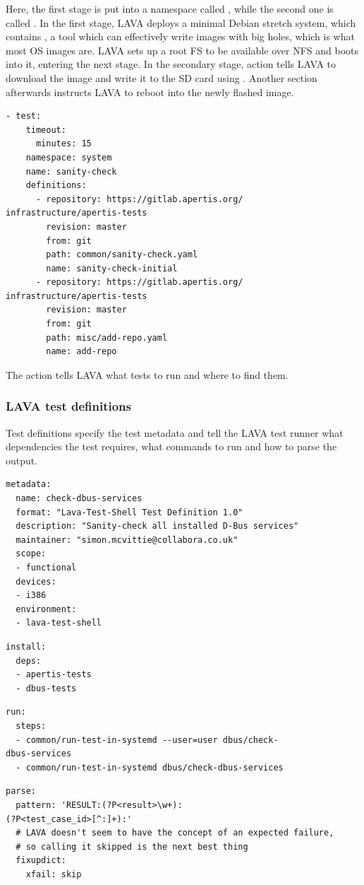 \documentclass[10pt, a5paper]{article}
\begin{document}
Here, the first stage is put into a namespace called \verb@flash@, while the second one is called \verb@system@. In the first stage, LAVA deploys a minimal Debian stretch system, which contains \verb@bmaptool@, a tool which can effectively write images with big holes, which is what most OS images are. LAVA sets up a root FS to be available over NFS and boots into it, entering the next stage. In the secondary stage, \verb@deploy@ action tells LAVA to download the image and write it to the SD card using \verb@bmaptool@. Another \verb@boot@ section afterwards instructs LAVA to reboot into the newly flashed image.

\begin{verbatim}
- test:
    timeout:
      minutes: 15
    namespace: system
    name: sanity-check
    definitions:
      - repository: https://gitlab.apertis.org/
infrastructure/apertis-tests
        revision: master
        from: git
        path: common/sanity-check.yaml
        name: sanity-check-initial
      - repository: https://gitlab.apertis.org/
infrastructure/apertis-tests
        revision: master
        from: git
        path: misc/add-repo.yaml
        name: add-repo\end{verbatim}


The \verb@test@ action tells LAVA what tests to run and where to find them.

\subsubsection*{LAVA test definitions}

Test definitions specify the test metadata and tell the LAVA test runner what dependencies the test requires, what commands to run and how to parse the output.

\begin{verbatim}
metadata:
  name: check-dbus-services
  format: "Lava-Test-Shell Test Definition 1.0"
  description: "Sanity-check all installed D-Bus services"
  maintainer: "simon.mcvittie@collabora.co.uk"
  scope:
  - functional
  devices:
  - i386
  environment:
  - lava-test-shell\end{verbatim}\begin{verbatim}install:
  deps:
  - apertis-tests
  - dbus-tests\end{verbatim}\begin{verbatim}run:
  steps:
  - common/run-test-in-systemd --user=user dbus/check-
dbus-services
  - common/run-test-in-systemd dbus/check-dbus-services\end{verbatim}\begin{verbatim}parse:
  pattern: 'RESULT:(?P<result>\w+):
(?P<test_case_id>[^:]+):'
  # LAVA doesn't seem to have the concept of an expected failure,
  # so calling it skipped is the next best thing
  fixupdict:
    xfail: skip\end{verbatim}
\end{document}
